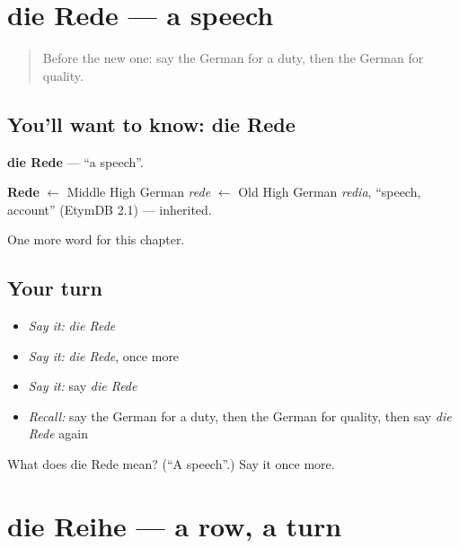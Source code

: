 \section[die Rede]{die Rede — a speech}

\label{lesson:GE-C236-rede}



\begin{quote}
Before the new one: say the German for a duty, then the German for quality.
\end{quote}

\subsection*{You'll want to know: die Rede}
\textbf{die Rede} — \textquotedblleft{}a speech\textquotedblright{}.

\begin{cousinweb}
\textbf{Rede} $\leftarrow$ Middle High German \emph{rede} $\leftarrow$ Old High German \emph{redia}, \textquotedblleft{}speech, account\textquotedblright{} (EtymDB 2.1) — inherited.
\end{cousinweb}

\begin{grammarlens}[title={What you've built}]
One more word for this chapter.
\end{grammarlens}

\subsection*{Your turn}
\begin{itemize}
\raggedright
  \item \emph{Say it:} \emph{die Rede}
  \item \emph{Say it:} \emph{die Rede}, once more
  \item \emph{Say it:} say \emph{die Rede}
  \item \emph{Recall:} say the German for a duty, then the German for quality, then say \emph{die Rede} again
\end{itemize}

\begin{tcolorbox}[breakable,colback=teal!4,colframe=teal!35!black,title={Before you move on}]
What does die Rede mean? (\textquotedblleft{}A speech\textquotedblright{}.) Say it once more.
\end{tcolorbox}
\section[die Reihe]{die Reihe — a row, a turn}

